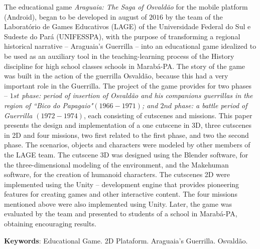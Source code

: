 %
%

\begin{ABSTRACT}
	\begin{SingleSpace}
				
		\hspace{-1.5cm}The educational game \textit{Araguaia: The Saga of Osvaldão} for the mobile platform (Android), began to be developed in august of $2016$ by the team of the Laboratório de Games Educativos (LAGE) of the Universidade Federal do Sul e Sudeste do Pará (UNIFESSPA), with the purpose of transforming a regional historical narrative -- Araguaia's Guerrilla -- into an educational game idealized to be used as an auxiliary tool in the teaching-learning process of the History discipline for high school classes schools in Marabá-PA. The story of the game was built in the action of the guerrilla Osvaldão, because this had a very important role in the Guerrilla. The project of the game provides for two phases -- \textit{$1st$ phase: period of insertion of Osvaldão and his companions guerrillas in the region of ``Bico do Papagaio"\space $(1966-1971)$; and $2nd$ phase: a battle period of Guerrilla $(1972-1974)$}, each consisting of cutscenes and missions. This paper presents the design and implementation of a one cutscene in 3D, three cutscenes in 2D and four missions, two first related to the first phase, and two the second phase. The scenarios, objects and characters were modeled by other members of the LAGE team. The cutscene 3D was designed using the Blender software, for the three-dimensional modeling of the environment, and the Makehuman software, for the creation of humanoid characters. The cutscenes 2D were implemented using the Unity -- development engine that provides pioneering features for creating games and other interactive content. The four missions mentioned above were also implemented using Unity. Later, the game was evaluated by the team and presented to students of a school in Marabá-PA, obtaining encouraging results.
		
		\vspace*{0.5cm}\hspace{-1.5 cm}\textbf{Keywords}: Educational Game. 2D Plataform. Araguaia's Guerrilla. Osvaldão.
				
	\end{SingleSpace}
	
\end{ABSTRACT}
